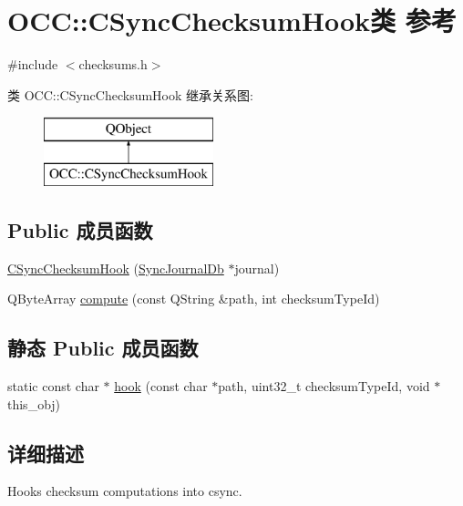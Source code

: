 \hypertarget{class_o_c_c_1_1_c_sync_checksum_hook}{}\section{O\+CC\+:\+:C\+Sync\+Checksum\+Hook类 参考}
\label{class_o_c_c_1_1_c_sync_checksum_hook}


{\ttfamily \#include $<$checksums.\+h$>$}

类 O\+CC\+:\+:C\+Sync\+Checksum\+Hook 继承关系图\+:\begin{figure}[H]
\begin{center}
\leavevmode
\includegraphics[height=2.000000cm]{class_o_c_c_1_1_c_sync_checksum_hook}
\end{center}
\end{figure}
\subsection*{Public 成员函数}
\begin{DoxyCompactItemize}
\item 
\hyperlink{class_o_c_c_1_1_c_sync_checksum_hook_ae118e2305f558a50e338fdab9a51b78b}{C\+Sync\+Checksum\+Hook} (\hyperlink{class_o_c_c_1_1_sync_journal_db}{Sync\+Journal\+Db} $\ast$journal)
\item 
Q\+Byte\+Array \hyperlink{class_o_c_c_1_1_c_sync_checksum_hook_ac956b58fe2ddbbbcdd6a8844445595e3}{compute} (const Q\+String \&path, int checksum\+Type\+Id)
\end{DoxyCompactItemize}
\subsection*{静态 Public 成员函数}
\begin{DoxyCompactItemize}
\item 
static const char $\ast$ \hyperlink{class_o_c_c_1_1_c_sync_checksum_hook_a960fe2cee59b5f4dc19ea89aa726ac3e}{hook} (const char $\ast$path, uint32\+\_\+t checksum\+Type\+Id, void $\ast$this\+\_\+obj)
\end{DoxyCompactItemize}


\subsection{详细描述}
Hooks checksum computations into csync. 

